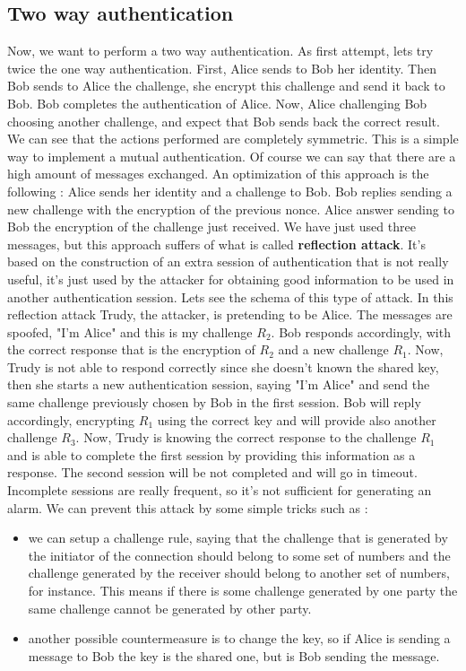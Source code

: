\documentclass[11pt]{article}
\begin{document}
\subsection{Two way authentication}
Now, we want to perform a two way authentication. As first attempt, lets try twice the one way authentication. First, Alice sends to Bob her identity. Then Bob sends to Alice the challenge, she encrypt this challenge and send it back to Bob. Bob completes the authentication of Alice. Now, Alice challenging Bob choosing another challenge, and expect that Bob sends back the correct result. We can see that the actions performed are completely symmetric. This is a simple way to implement a mutual authentication. Of course we can say that there are a high amount of messages exchanged. An optimization of this approach is the following : Alice sends her identity and a challenge to Bob. Bob replies sending a new challenge with the encryption of the previous nonce. Alice answer sending to Bob the encryption of the challenge just received. We have just used three messages, but this approach suffers of what is called \textbf{reflection attack}. It's based on the construction of an extra session of authentication that is not really useful, it's just used by the attacker for obtaining good information to be used in another authentication session. Lets see the schema of this type of attack. In this reflection attack Trudy, the attacker, is pretending to be Alice. The messages are spoofed, "I'm Alice" and this is my challenge $R_2$. Bob responds accordingly, with the correct response that is the encryption of $R_2$ and a new challenge $R_1$. Now, Trudy is not able to respond correctly since she doesn't known the shared key, then she starts a new authentication session, saying "I'm Alice" and send the same challenge previously chosen by Bob in the first session. Bob will reply accordingly, encrypting $R_1$ using the correct key and will provide also another challenge $R_3$. Now, Trudy is knowing the correct response to the challenge $R_1$ and is able to complete the first session by providing this information as a response. The second session will be not completed and will go in timeout. Incomplete sessions are really frequent, so it's not sufficient for generating an alarm. We can prevent this attack by some simple tricks such as :
\begin{itemize}
\item we can setup a challenge rule, saying that the challenge that is generated by the initiator of the connection should belong to some set of numbers and the challenge generated by the receiver should belong to another set of numbers, for instance. This means if there is some challenge generated by one party the same challenge cannot be generated by other party.
\item another possible countermeasure is to change the key, so if Alice is sending a message to Bob the key is the shared one, but is Bob sending the message.
\end{itemize} 
\end{document}
